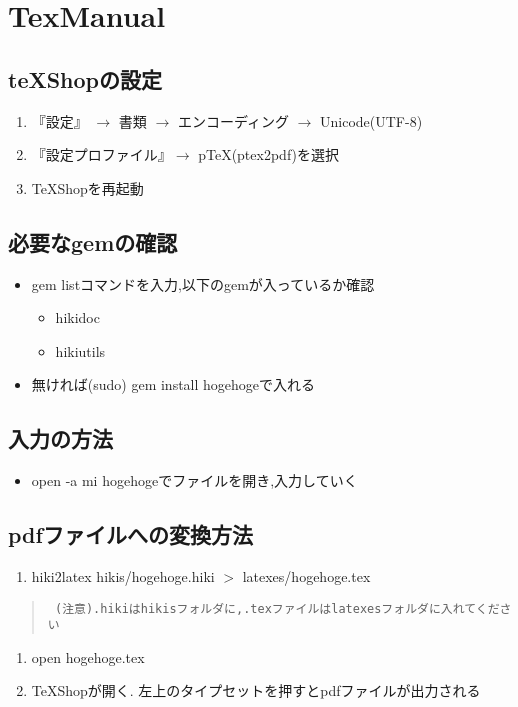 \documentclass[12pt,a4paper]{jsarticle}
\begin{document}
\section{TexManual}
\subsection{teXShopの設定}\begin{enumerate}
\item 『設定』 $\rightarrow$ ︎書類 $\rightarrow$ ︎エンコーディング $\rightarrow$ Unicode(UTF-8)
\item 『設定プロファイル』$\rightarrow$ pTeX(ptex2pdf)を選択
\item TeXShopを再起動
\end{enumerate}
\subsection{必要なgemの確認}\begin{itemize}
\item gem listコマンドを入力,以下のgemが入っているか確認\begin{itemize}
\item hikidoc
\item hikiutils
\end{itemize}
\item ︎︎無ければ(sudo) gem install hogehogeで入れる
\end{itemize}
\subsection{入力の方法}\begin{itemize}
\item open -a mi hogehogeでファイルを開き,入力していく
\end{itemize}
\subsection{pdfファイルへの変換方法}\begin{enumerate}
\item hiki2latex hikis/hogehoge.hiki $>$ latexes/hogehoge.tex
\end{enumerate}\begin{quote}\begin{verbatim}
 (注意).hikiはhikisフォルダに,.texファイルはlatexesフォルダに入れてください
\end{verbatim}\end{quote}\begin{enumerate}
\item open hogehoge.tex
\item TeXShopが開く. 左上のタイプセットを押すとpdfファイルが出力される
\end{enumerate}
\end{document}
